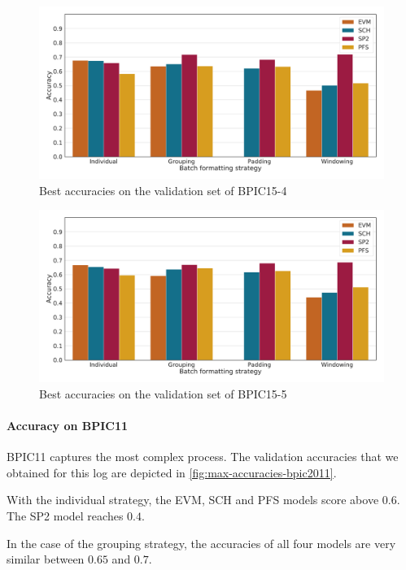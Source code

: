 \begin{figure}
    \centering
    \includegraphics[width=\textwidth]{gfx/bpic2015_4/accuracies.pdf}
    \caption{Best accuracies on the validation set of BPIC15-4}
    \label{fig:max-accuracies-bpic2015-4}
\end{figure}
\begin{figure}
    \centering
    \includegraphics[width=\textwidth]{gfx/bpic2015_5/accuracies.pdf}
    \caption{Best accuracies on the validation set of BPIC15-5}
    \label{fig:max-accuracies-bpic2015-5}
\end{figure}
\FloatBarrier

\paragraph{Accuracy on BPIC11}
BPIC11 captures the most complex process.
The validation accuracies that we obtained for this log are depicted in \autoref{fig:max-accuracies-bpic2011}.

With the individual strategy, the EVM, SCH and PFS models score above $0.6$.
The SP2 model reaches $0.4$.

In the case of the grouping strategy, the accuracies of all four models are very similar between $0.65$ and $0.7$.


